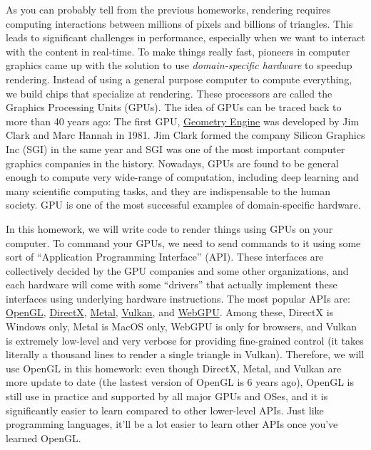 




As you can probably tell from the previous homeworks, rendering requires computing interactions between millions of pixels and billions of triangles. This leads to significant challenges in performance, especially when we want to interact with the content in real-time. To make things really fast, pioneers in computer graphics came up with the solution to use \emph{domain-specific hardware} to speedup rendering. Instead of using a general purpose computer to compute everything, we build chips that specialize at rendering. These processors are called the Graphics Processing Units (GPUs). The idea of GPUs can be traced back to more than 40 years ago: The first GPU, \href{https://www.computer.org/publications/tech-news/chasing-pixels/geometry-engine}{Geometry Engine} was developed by Jim Clark and Marc Hannah in 1981. Jim Clark formed the company Silicon Graphics Inc (SGI) in the same year and SGI was one of the most important computer graphics companies in the history. Nowadays, GPUs are found to be general enough to compute very wide-range of computation, including deep learning and many scientific computing tasks, and they are indispensable to the human society. GPU is one of the most successful examples of domain-specific hardware.

In this homework, we will write code to render things using GPUs on your computer. To command your GPUs, we need to send commands to it using some sort of ``Application Programming Interface'' (API). These interfaces are collectively decided by the GPU companies and some other organizations, and each hardware will come with some ``drivers'' that actually implement these interfaces using underlying hardware instructions. The most popular APIs are: \href{https://en.wikipedia.org/wiki/OpenGL}{OpenGL}, \href{https://en.wikipedia.org/wiki/DirectX}{DirectX}, \href{https://en.wikipedia.org/wiki/Metal_(API)}{Metal}, \href{https://en.wikipedia.org/wiki/Vulkan}{Vulkan}, and \href{https://en.wikipedia.org/wiki/WebGPU}{WebGPU}. Among these, DirectX is Windows only, Metal is MacOS only, WebGPU is only for browsers, and Vulkan is extremely low-level and very verbose for providing fine-grained control (it takes literally a thousand lines to render a single triangle in Vulkan). Therefore, we will use OpenGL in this homework: even though DirectX, Metal, and Vulkan are more update to date (the lastest version of OpenGL is 6 years ago), OpenGL is still use in practice and supported by all major GPUs and OSes, and it is significantly easier to learn compared to other lower-level APIs. Just like programming languages, it'll be a lot easier to learn other APIs once you've learned OpenGL.

